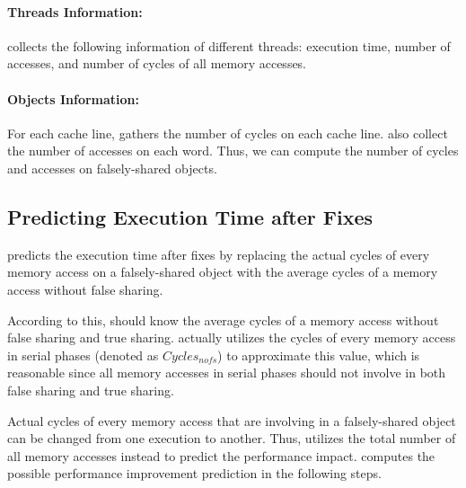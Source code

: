 \paragraph{Threads Information:} \Cheetah{} collects the following information of different threads: execution time, number of accesses, and number of cycles of all memory accesses. 

\paragraph{Objects Information:}
For each cache line, \cheetah{} gathers the number of cycles on each cache line. \cheetah{} also collect the number of accesses on each word. Thus, we can compute the number of cycles and accesses on falsely-shared objects. 
 
\subsection{Predicting Execution Time after Fixes}
\label{sec:predicttime}

\cheetah{} predicts the execution time after fixes by replacing the actual cycles of every memory access on a falsely-shared object with the average cycles of a memory access without false sharing. 

According to this, \cheetah{} should know the average cycles of a memory access without false sharing and true sharing. \Cheetah{} actually utilizes the cycles of every memory access in serial phases (denoted as $Cycles_{nofs}$) to approximate this value, which is reasonable since all memory accesses in serial phases should not involve in both false sharing and true sharing. 

Actual cycles of every memory access that are involving in a falsely-shared object can be changed from one execution to another. Thus, \cheetah{} utilizes the total number of all memory accesses instead to predict the performance impact. \Cheetah{} computes the possible performance improvement prediction in the following steps.
 
